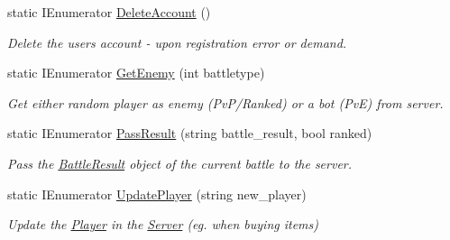 \begin{DoxyCompactItemize}
static I\+Enumerator \mbox{\hyperlink{class_server_a3f176e4b6cca1229cba9694566d25e32}{Delete\+Account}} ()
\begin{DoxyCompactList}\small\item\em Delete the user\textquotesingle{}s account -\/ upon registration error or demand. \end{DoxyCompactList}\item 
static I\+Enumerator \mbox{\hyperlink{class_server_ab8763dec1a3a83e91962022cbcf405db}{Get\+Enemy}} (int battletype)
\begin{DoxyCompactList}\small\item\em Get either random player as enemy (Pv\+P/\+Ranked) or a bot (PvE) from server. \end{DoxyCompactList}\item 
static I\+Enumerator \mbox{\hyperlink{class_server_ac8137eb1cd7752cf3231cd3d1539a849}{Pass\+Result}} (string battle\+\_\+result, bool ranked)
\begin{DoxyCompactList}\small\item\em Pass the \mbox{\hyperlink{class_battle_result}{Battle\+Result}} object of the current battle to the server. \end{DoxyCompactList}\item 
static I\+Enumerator \mbox{\hyperlink{class_server_a80d81b83c802dfa2afd77f17dae0b28e}{Update\+Player}} (string new\+\_\+player)
\begin{DoxyCompactList}\small\item\em Update the \mbox{\hyperlink{class_player}{Player}} in the \mbox{\hyperlink{class_server}{Server}} (eg. when buying items) \end{DoxyCompactList}\end{DoxyCompactItemize}
